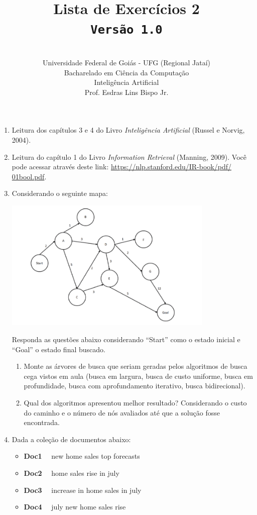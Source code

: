 \documentclass[12pt,a4paper,oneside]{article}
\author{\\Universidade Federal de Goiás - UFG (Regional Jataí) \\Bacharelado em Ciência da Computação \\Inteligência Artificial \\Prof. Esdras Lins Bispo Jr.}
\title{
	{\sc \huge Lista de Exercícios 2} 
	\\{\tt Versão 1.0}
}
\begin{document}
\maketitle

\begin{enumerate}

	\item Leitura dos capítulos 3 e 4 do Livro {\it Inteligência Artificial} (Russel e Norvig, 2004).
	
	\item Leitura do capítulo 1 do Livro {\it Information Retrieval} (Manning, 2009). Você pode acessar através deste link: \url{https://nlp.stanford.edu/IR-book/pdf/ 01bool.pdf}.
	
	\item Considerando o seguinte mapa:
	
	\begin{center}
		\includegraphics[width=10cm]{images/fig04.png}
	\end{center}
	
	Responda as questões abaixo considerando ``Start'' como o estado inicial e ``Goal'' o estado final buscado.
	
	\begin{enumerate}
		\item Monte as árvores de busca que seriam geradas pelos algoritmos de busca cega vistos em aula (busca em largura, busca de custo uniforme, busca em profundidade, busca com aprofundamento iterativo, busca bidirecional).
		\item Qual dos algoritmos apresentou melhor resultado? Considerando o custo do caminho e o número de nós avaliados até que a solução fosse encontrada.
	\end{enumerate}

	\item Dada a coleção de documentos abaixo:
	
	\begin{itemize}
		\item[] {\bf Doc1} \ \ new home sales top forecasts
		\item[] {\bf Doc2} \ \ home sales rise in july
		\item[] {\bf Doc3} \ \ increase in home sales in july
		\item[] {\bf Doc4} \ \ july new home sales rise
	\end{itemize}
	

\end{enumerate}
\end{document}
